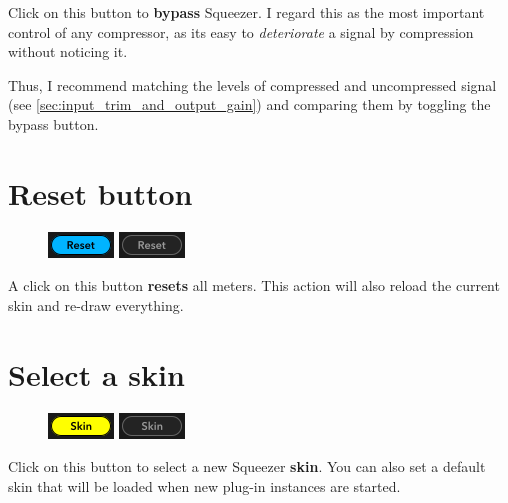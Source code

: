 Click on this button to \textbf{bypass} Squeezer.  I regard this as
the most important control of any compressor, as its easy to
\emph{deteriorate} a signal by compression without noticing it.

Thus, I recommend matching the levels of compressed and uncompressed
signal (see \ref{sec:input_trim_and_output_gain}) and comparing them
by toggling the bypass button.

\section{Reset button}

\begin{figure}
  \includegraphics[scale=\screenshotscale,clip]{include/images/button_reset_on.png}
  \newline \vspace{-0.9\baselineskip}
  \includegraphics[scale=\screenshotscale,clip]{include/images/button_reset_off.png}
\end{figure}

A click on this button \textbf{resets} all meters.  This action will
also reload the current skin and re-draw everything.

\section{Select a skin}

\begin{figure}
  \includegraphics[scale=\screenshotscale,clip]{include/images/button_skin_on.png}
  \newline \vspace{-0.9\baselineskip}
  \includegraphics[scale=\screenshotscale,clip]{include/images/button_skin_off.png}
\end{figure}

Click on this button to select a new Squeezer \textbf{skin}.  You can
also set a default skin that will be loaded when new plug-in instances
are started.

